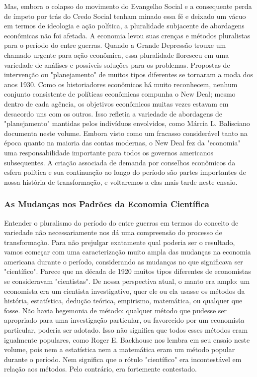 \documentclass[12pt]{article}
\begin{document}
Mas, embora o colapso do movimento do Evangelho Social e a consequente perda de ímpeto por trás do Credo Social tenham minado essa fé e deixado um vácuo em termos de ideologia e ação política, a pluralidade subjacente de abordagens econômicas não foi afetada. A economia levou suas crenças e métodos pluralistas para o período do entre guerras. Quando a Grande Depressão trouxe um chamado urgente para ação econômica, essa pluralidade floresceu em uma variedade de análises e possíveis soluções para os problemas. Propostas de intervenção ou "planejamento" de muitos tipos diferentes se tornaram a moda dos anos 1930. Como os historiadores econômicos há muito reconhecem, nenhum conjunto consistente de políticas econômicas compunha o New Deal; mesmo dentro de cada agência, os objetivos econômicos muitas vezes estavam em desacordo uns com os outros. Isso refletia a variedade de abordagens de "planejamento" mantidas pelos indivíduos envolvidos, como Márcia L. Balisciano documenta neste volume. Embora visto como um fracasso considerável tanto na época quanto na maioria das contas modernas, o New Deal fez da "economia" uma responsabilidade importante para todos os governos americanos subsequentes. A criação associada de demanda por conselhos econômicos da esfera política e sua continuação ao longo do período são partes importantes de nossa história de transformação, e voltaremos a elas mais tarde neste ensaio.

\subsubsection{\textbf{As Mudanças nos Padrões da Economia Científica}}


Entender o pluralismo do período do entre guerras em termos do conceito de variedade não necessariamente nos dá uma compreensão do processo de transformação. Para não prejulgar exatamente qual poderia ser o resultado, vamos começar com uma caracterização muito ampla das mudanças na economia americana durante o período, considerando as mudanças no que significava ser "científico". Parece que na década de 1920 muitos tipos diferentes de economistas se consideravam "cientistas". De nossa perspectiva atual, o manto era amplo: um economista era um cientista investigativo, quer ele ou ela usasse os métodos da história, estatística, dedução teórica, empirismo, matemática, ou qualquer que fosse. Não havia hegemonia de método: qualquer método que pudesse ser apropriado para uma investigação particular, ou favorecido por um economista particular, poderia ser adotado. Isso não significa que todos esses métodos eram igualmente populares, como Roger E. Backhouse nos lembra em seu ensaio neste volume, pois nem a estatística nem a matemática eram um método popular durante o período. Nem significa que o rótulo "científico" era incontestável em relação aos métodos. Pelo contrário, era fortemente contestado.
\end{document}
